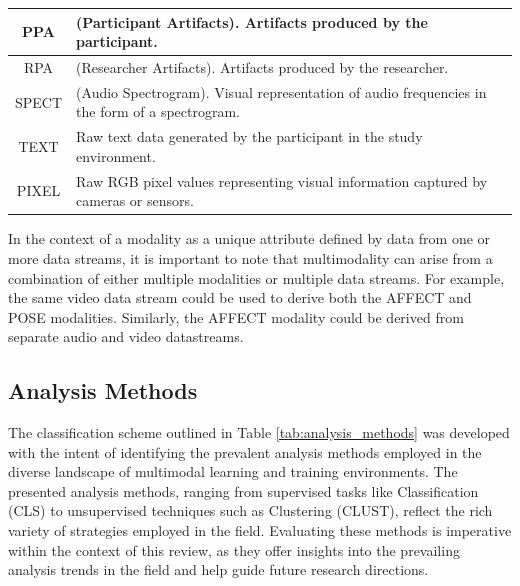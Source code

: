 \documentclass[manuscript,screen,review]{acmart}
\begin{document}
\begin{table}[ht]
\begin{tabular}{|c|p{}|}
    \hline
    PPA & (Participant Artifacts). Artifacts produced by the participant. \\
    \hline
    RPA & (Researcher Artifacts). Artifacts produced by the researcher. \\
    \hline
    SPECT & (Audio Spectrogram). Visual representation of audio frequencies in the form of a spectrogram. \\
    \hline
    TEXT & Raw text data generated by the participant in the study environment. \\
    \hline
    PIXEL & Raw RGB pixel values representing visual information captured by cameras or sensors. \\
    \hline
  \end{tabular}
  \label{tab:modalities}
\end{table}

In the context of a modality as a unique attribute defined by data from one or more data streams, it is important to note that multimodality can arise from a combination of either multiple modalities or multiple data streams. For example, the same video data stream could be used to derive both the AFFECT and POSE modalities. %
Similarly, the AFFECT modality could be derived from separate audio and video datastreams. %

\subsection{Analysis Methods} \label{subsec:analyis_methods}

The classification scheme outlined in Table \ref{tab:analysis_methods} was developed with the intent of identifying the prevalent analysis methods employed in the diverse landscape of multimodal learning and training environments. The presented analysis methods, ranging from supervised tasks like Classification (CLS) to unsupervised techniques such as Clustering (CLUST), reflect the rich variety of strategies employed in the field. Evaluating these methods is imperative within the context of this review, as they offer insights into the prevailing analysis trends in the field and help guide future research directions.
\end{document}
